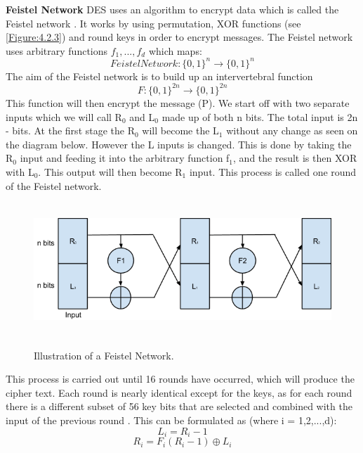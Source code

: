 \documentclass[11pt,a4paper]{report}
\begin{document}
\textbf{Feistel Network}\newline
DES uses an algorithm to encrypt data which is called the Feistel network \cite{DBLP:books/sp/Buchmann02}. It works by using permutation, XOR functions (see \ref{Figure:4.2.3}) and round keys in order to encrypt messages. The Feistel network uses arbitrary functions $f_{1},...,f_{d}$ which maps:
\begin{displaymath}
FeistelNetwork: \{0,1\}^n \rightarrow \{0,1\}^n
\end{displaymath}
The aim of the Feistel network is to build up an intervertebral function
\begin{displaymath}
F: \{0,1\}^{2n} \rightarrow \{0,1\}^{2n}
\end{displaymath}
This function will then encrypt the message (P). We start off with two separate inputs which we will call R$_{0}$ and L$_{0}$ made up of both n bits. The total input is 2n - bits. At the first stage the R$_{0}$ will become the L$_{1}$ without any change as seen on the diagram below. However the L inputs is changed. This is done by taking the R$_{0}$ input and feeding it into the arbitrary function f$_{1}$, and the result is then XOR with L$_{0}$. This output will then become R$_{1}$ input. This process is called one round of the Feistel network.
\begin{figure}[h]
\centering
\includegraphics[width=12cm, height=5cm]{FeistelNet.png}
\label{Fig: Feistel Network}
\caption{Illustration of a Feistel Network.}
\end{figure}

This process is carried out until 16 rounds have occurred, which will produce the cipher text. Each round is nearly identical except for the keys, as for each round there is a different subset of 56
key bits that are selected and combined with the input of the previous round \cite{Fabio2000LogicalSAT}. 
This can be formulated as (where i = 1,2,...,d):
\begin{displaymath}
L_{i} = R_{i}-1
\end{displaymath}
\begin{displaymath}
R_{i} = F_{i} (R_{i}-1) \oplus L_{i}
\end{displaymath}
\end{document}
